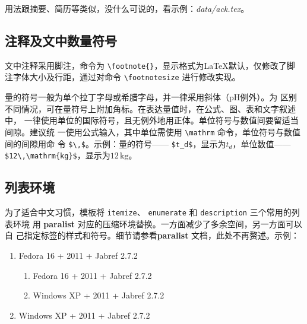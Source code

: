 用法跟摘要、简历等类似，没什么可说的，看示例：\emph{data/ack.tex}。

\subsection*{注释及文中数量符号}

文中注释采用脚注，命令为 \verb|\footnote{}|，显示格式为\LaTeX{}默认，仅修改了脚
注字体大小及行距，通过对命令 \verb|\footnotesize| 进行修改实现。

量的符号一般为单个拉丁字母或希腊字母，并一律采用斜体（$\mathrm{pH}$例外）。为
区别不同情况，可在量符号上附加角标。在表达量值时，在公式、图、表和文字叙述中，
一律使用单位的国际符号，且无例外地用正体。单位符号与数值间要留适当间隙。建议统
一使用公式输入，其中单位需使用 \verb|\mathrm| 命令，单位符号与数值间的间隙用命
令 \verb|$\,$|。示例：量的符号—— \verb|$t_d$|，显示为$t_d$，单位数值——
\verb|$12\,\mathrm{kg}$|，显示为$12\,\mathrm{kg}$。

\subsection*{列表环境}

为了适合中文习惯，模板将 \texttt{itemize}、 \texttt{enumerate} 和
\texttt{description} 三个常用的列表环境
用 \textbf{paralist} 对应的压缩环境替换。一方面减少了多余空间，另一方面可以自
己指定标签的样式和符号。细节请参看\textbf{paralist} 文档，此处不再赘述。示例：
\begin{enumerate}
\item Fedora 16 + \TeXLive{} 2011 + Jabref 2.7.2
  \begin{enumerate}
    \item Fedora 16 + \TeXLive{} 2011 + Jabref 2.7.2
    \item Windows XP + \TeXLive{} 2011 + Jabref 2.7.2
  \end{enumerate}
\item Windows XP + \TeXLive{} 2011 + Jabref 2.7.2
\end{enumerate}
